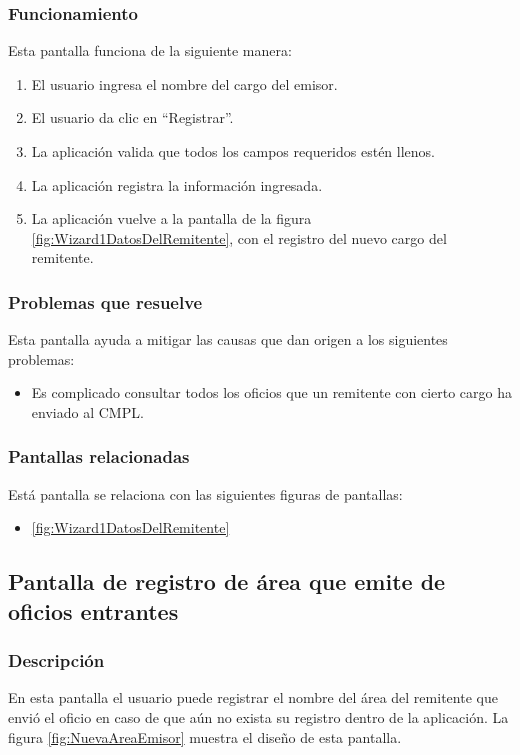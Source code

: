 \subsubsection{Funcionamiento}
	Esta pantalla funciona de la siguiente manera:
	
	\begin{enumerate}
		\item El usuario ingresa el nombre del cargo del emisor.
		\item El usuario da clic en ``Registrar''.
		\item La aplicación valida que todos los campos requeridos estén llenos.
		\item La aplicación registra la información ingresada.
		\item La aplicación vuelve a la pantalla de la figura \ref{fig:Wizard1DatosDelRemitente}, con el registro del nuevo cargo del remitente.
	\end{enumerate}

\subsubsection{Problemas que resuelve}
Esta pantalla ayuda a mitigar las causas que dan origen a los siguientes problemas:

	\begin{itemize}
		\item Es complicado consultar todos los oficios que un remitente con cierto cargo ha enviado al CMPL.
	\end{itemize}

\subsubsection{Pantallas relacionadas}
Está pantalla se relaciona con las siguientes figuras de pantallas:
	\begin{itemize}
		\item \ref{fig:Wizard1DatosDelRemitente}
	\end{itemize}

\subsection{Pantalla de registro de área que emite de oficios entrantes}
\subsubsection{Descripción}
	En esta pantalla el usuario puede registrar el nombre del área del remitente que envió el oficio en caso de que aún no exista su registro dentro de la aplicación. La figura \ref{fig:NuevaAreaEmisor} muestra el diseño de esta pantalla.		
		
